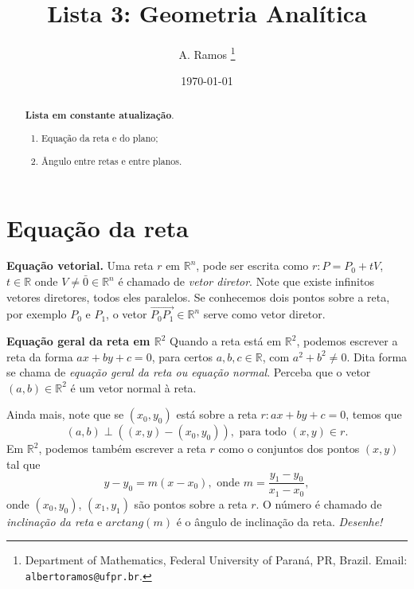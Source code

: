\documentclass{article}
\theoremstyle{plain}
\theoremstyle{definition}
\theoremstyle{remark}
\begin{document}
\title{Lista 3: Geometria Analítica}

\author{
A. Ramos \thanks{Department of Mathematics,
    Federal University of Paraná, PR, Brazil.
    Email: {\tt albertoramos@ufpr.br}.}
}

\date{\today}
 
\maketitle

\begin{abstract}
{\bf Lista em constante atualização}.
 \begin{enumerate}
 \item Equação da reta e do plano; %
 \item Ângulo entre retas e entre planos.
 \end{enumerate}
\end{abstract}


\section*{Equação da reta}
 {\bf Equação vetorial.} 
 Uma reta $r$ em $\mathbb{R}^{n}$, pode ser escrita como 
 $r: P=P_{0}+tV$, $t \in \mathbb{R}$ 
 onde $V \neq \bar{0} \in \mathbb{R}^{n}$ é chamado de {\it vetor diretor}. 
 Note que existe infinitos vetores diretores, todos eles paralelos. 
 Se conhecemos dois pontos sobre a reta, por exemplo $P_{0}$ e $P_1$, o vetor 
 $\overrightarrow{P_0P_1} \in \mathbb{R}^{n}$ serve como vetor diretor. 
  
  {\bf Equação geral da reta em $\mathbb{R}^{2}$}
 Quando a reta está em $\mathbb{R}^{2}$, podemos escrever a reta da forma 
$ax+by+c=0$, para certos $a,b, c \in \mathbb{R}$, com $a^{2}+b^{2}\neq0$. Dita forma se chama de 
 {\it equação geral da reta ou equação normal}. Perceba que o vetor 
 $(a,b) \in \mathbb{R}^{2}$ é um vetor normal à reta. 
 
 Ainda mais,  note que se $(x_0, y_{0})$ está sobre a reta 
 $r: ax+by+c=0$, temos que 
 $$ (a,b) \perp ((x,y)-(x_0,y_0)), \text{ para todo } (x,y) \in r. $$ 
 Em $\mathbb{R}^{2}$, podemos também escrever a reta $r$ como o conjuntos dos pontos 
 $(x,y)$ tal que 
 $$ y-y_{0}= m (x-x_{0}), \text{ onde } m= \frac{y_1-y_0}{x_1-x_0}, $$ 
 onde $(x_0,y_0)$, $(x_1, y_1)$ são pontos sobre a reta $r$. 
 O número é chamado de {\it inclinação da reta} e $arctang(m)$ é o ângulo de inclinação da reta. {\it Desenhe!} 
  
\end{document}
